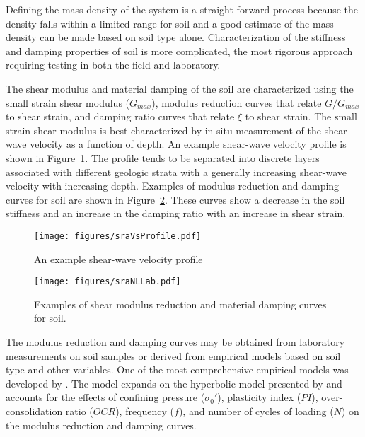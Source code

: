 \documentclass[11pt]{report}
\begin{document}
Defining the mass density of the system is a straight forward process because the density falls
within a limited range for soil and a good estimate of the mass density can be made based on soil
type alone.  Characterization of the stiffness and damping properties of soil is more complicated,
the most rigorous approach requiring testing in both the field and laboratory.  

The shear modulus and material damping of the soil are characterized using the small strain shear
modulus ($G_{max}$), modulus reduction curves that relate $G/G_{max}$ to shear strain, and damping
ratio curves that relate $\xi$ to shear strain.  The small strain shear modulus is best
characterized by in situ measurement of the shear-wave velocity as a function of depth.  An example
shear-wave velocity profile is shown in Figure~\ref{fig:sraVsProfile}. The profile tends to be
separated into discrete layers associated with different geologic strata with a generally increasing
shear-wave velocity with increasing depth.  Examples of modulus reduction and damping curves for
soil are shown in Figure~\ref{fig:sraNLLab}.  These curves show a decrease in the soil stiffness and
an increase in the damping ratio with an increase in shear strain. 

\begin{figure}[tb]
	\begin{center}
		\texttt{[image: figures/sraVsProfile.pdf]}
	\end{center}
	\caption{An example shear-wave velocity profile}
	\label{fig:sraVsProfile}
\end{figure}
\begin{figure}[tb]
	\centering
	\texttt{[image: figures/sraNLLab.pdf]}
	\caption{Examples of shear modulus reduction and material damping curves for soil.}
	\label{fig:sraNLLab}
\end{figure}

The modulus reduction and damping curves may be obtained from laboratory measurements on soil
samples or derived from empirical models based on soil type and other variables.  One of the most
comprehensive empirical models was developed by \citet{darendeli:01}.  The model expands on the
hyperbolic model presented by \citet{hardin:72} and accounts for the effects of confining pressure
($\sigma_0'$), plasticity index ($PI$), over-consolidation ratio ($OCR$), frequency ($f$), and
number of cycles of loading ($N$) on the modulus reduction and damping curves. 
\end{document}

